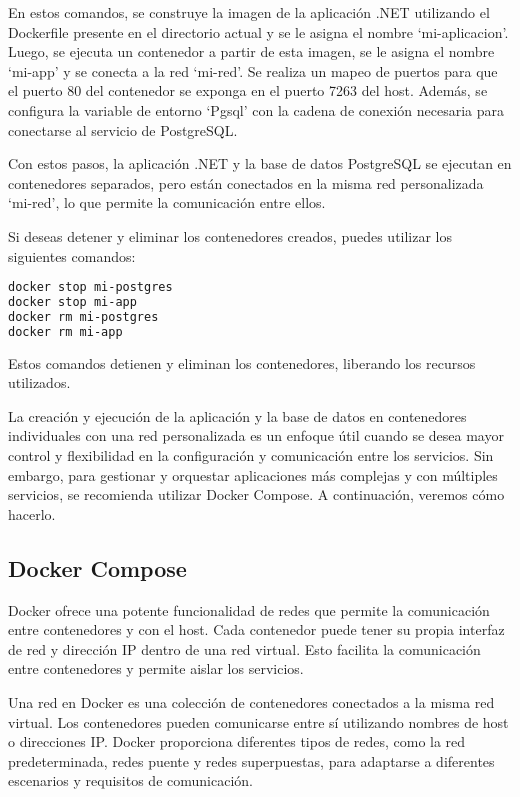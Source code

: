 \documentclass{article}
\begin{document}
En estos comandos, se construye la imagen de la aplicación .NET utilizando el Dockerfile presente en el directorio actual y se le asigna el nombre \enquote*{mi-aplicacion}. Luego, se ejecuta un contenedor a partir de esta imagen, se le asigna el nombre \enquote*{mi-app} y se conecta a la red \enquote*{mi-red}. Se realiza un mapeo de puertos para que el puerto 80 del contenedor se exponga en el puerto 7263 del host. Además, se configura la variable de entorno \enquote*{Pgsql} con la cadena de conexión necesaria para conectarse al servicio de PostgreSQL.

Con estos pasos, la aplicación .NET y la base de datos PostgreSQL se ejecutan en contenedores separados, pero están conectados en la misma red personalizada \enquote*{mi-red}, lo que permite la comunicación entre ellos.

Si deseas detener y eliminar los contenedores creados, puedes utilizar los siguientes comandos:

\begin{lstlisting}[language=bash]
docker stop mi-postgres
docker stop mi-app
docker rm mi-postgres
docker rm mi-app
\end{lstlisting}

Estos comandos detienen y eliminan los contenedores, liberando los recursos utilizados.

La creación y ejecución de la aplicación y la base de datos en contenedores individuales con una red personalizada es un enfoque útil cuando se desea mayor control y flexibilidad en la configuración y comunicación entre los servicios. Sin embargo, para gestionar y orquestar aplicaciones más complejas y con múltiples servicios, se recomienda utilizar Docker Compose. A continuación, veremos cómo hacerlo.

\subsection{Docker Compose}

Docker ofrece una potente funcionalidad de redes que permite la comunicación entre contenedores y con el host. Cada contenedor puede tener su propia interfaz de red y dirección IP dentro de una red virtual. Esto facilita la comunicación entre contenedores y permite aislar los servicios.

Una red en Docker es una colección de contenedores conectados a la misma red virtual. Los contenedores pueden comunicarse entre sí utilizando nombres de host o direcciones IP. Docker proporciona diferentes tipos de redes, como la red predeterminada, redes puente y redes superpuestas, para adaptarse a diferentes escenarios y requisitos de comunicación.
\end{document}

